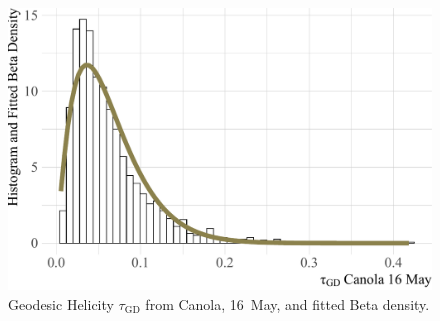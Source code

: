 \documentclass[journal]{IEEEtran}
\begin{document}
\begin{figure}[hbt]
	\centering
	\includegraphics[width=\linewidth]{CanolaHelicityBetaFit}
	\caption{Geodesic Helicity $\tau_{\text{GD}}$ from Canola, 16~May, and fitted Beta density.}\label{fig:WorstHelicityBetaFit}
\end{figure}

\textcolor{red}{\hrulefill}

 


\end{document}
